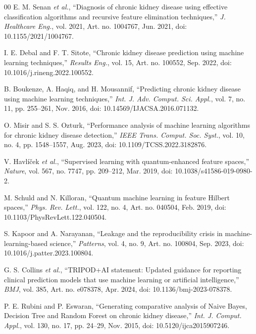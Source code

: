 \documentclass[conference]{IEEEtran}
\begin{document}
{\begin{thebibliography}{00}
E. M. Senan \emph{et al.}, ``Diagnosis of chronic kidney disease using effective classification algorithms and recursive feature elimination techniques,'' \emph{J. Healthcare Eng.}, vol. 2021, Art. no. 1004767, Jun. 2021, doi: 10.1155/2021/1004767.

I. E. Debal and F. T. Sitote, ``Chronic kidney disease prediction using machine learning techniques,'' \emph{Results Eng.}, vol. 15, Art. no. 100552, Sep. 2022, doi: 10.1016/j.rineng.2022.100552.

B. Boukenze, A. Haqiq, and H. Mousannif, ``Predicting chronic kidney disease using machine learning techniques,'' \emph{Int. J. Adv. Comput. Sci. Appl.}, vol. 7, no. 11, pp. 255--261, Nov. 2016, doi: 10.14569/IJACSA.2016.071132.

O. Misir and S. S. Ozturk, ``Performance analysis of machine learning algorithms for chronic kidney disease detection,'' \emph{IEEE Trans. Comput. Soc. Syst.}, vol. 10, no. 4, pp. 1548--1557, Aug. 2023, doi: 10.1109/TCSS.2022.3182876.

V. Havl{\'i}{\v{c}}ek \emph{et al.}, ``Supervised learning with quantum-enhanced feature spaces,'' \emph{Nature}, vol. 567, no. 7747, pp. 209--212, Mar. 2019, doi: 10.1038/s41586-019-0980-2.

M. Schuld and N. Killoran, ``Quantum machine learning in feature Hilbert spaces,'' \emph{Phys. Rev. Lett.}, vol. 122, no. 4, Art. no. 040504, Feb. 2019, doi: 10.1103/PhysRevLett.122.040504.

S. Kapoor and A. Narayanan, ``Leakage and the reproducibility crisis in machine-learning-based science,'' \emph{Patterns}, vol. 4, no. 9, Art. no. 100804, Sep. 2023, doi: 10.1016/j.patter.2023.100804.

G. S. Collins \emph{et al.}, ``TRIPOD+AI statement: Updated guidance for reporting clinical prediction models that use machine learning or artificial intelligence,'' \emph{BMJ}, vol. 385, Art. no. e078378, Apr. 2024, doi: 10.1136/bmj-2023-078378.

P. E. Rubini and P. Eswaran, ``Generating comparative analysis of Naive Bayes, Decision Tree and Random Forest on chronic kidney disease,'' \emph{Int. J. Comput. Appl.}, vol. 130, no. 17, pp. 24--29, Nov. 2015, doi: 10.5120/ijca2015907246.


\end{thebibliography}}
\end{document}
